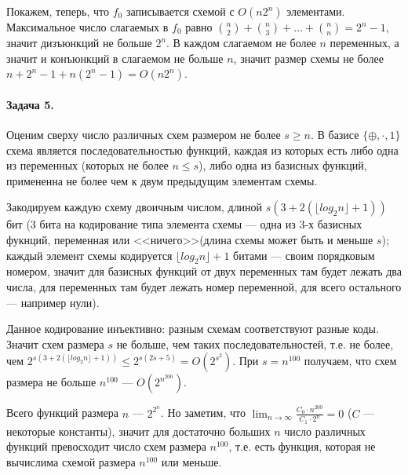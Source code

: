 \documentclass{article}
\begin{document}
    Покажем, теперь, что $f_0$ записывается схемой с $O(n2^n)$ элементами. Максимальное число слагаемых в $f_0$ равно ${n \choose 2} + {n \choose 3} + \ldots + {n \choose n} = 2^n - 1$, значит дизъюнкций не больше $2^n$. В каждом слагаемом не более $n$ переменных, а значит и конъюнкций в слагаемом не больше $n$, значит размер схемы не более $n + 2^n - 1 + n(2^n - 1) = O(n2^n)$.

    \paragraph{Задача 5.}
    Оценим сверху число различных схем размером не более $s \ge n$. В базисе $\{\oplus, \cdot, 1\}$ схема является последовательностью функций, каждая из которых есть либо одна из переменных (которых не более $n \le s$), либо одна из базисных функций, примененна не более чем к двум предыдущим элементам схемы.

    Закодируем каждую схему двоичным числом, длиной $s(3 + 2(\lfloor log_2 n \rfloor + 1))$ бит (3 бита на кодирование типа элемента схемы --- одна из 3-х базисных фукнций, переменная или <<ничего>>(длина схемы может быть и меньше $s$); каждый элемент схемы кодируется $\lfloor log_2 n \rfloor + 1$ битами --- своим порядковым номером, значит для базисных функций от двух переменных там будет лежать два числа, для переменных там будет лежать номер переменной, для всего остального --- например нули).

    Данное кодирование инъективно: разным схемам соответствуют разные коды. Значит схем размера $s$ не больше, чем таких последовательностей, т.е. не более, чем $2^{s(3 + 2(\lfloor log_2 n \rfloor + 1))} \le 2^{s(2s + 5)} = O(2^{s^2})$. При $s = n^{100}$ получаем, что схем размера не больше $n^{100}$ ---  $O(2^{n^{200}})$.

    Всего функций размера $n$ --- $2^{2^n}$. Но заметим, что $\displaystyle{ \lim_{n \to \infty} \frac{C_0 \cdot n^{200}}{C_1 \cdot 2^n} = 0}$ ($C$ --- некоторые константы), значит для достаточно больших $n$ число различных функций превосходит число схем размера $n^{100}$, т.е. есть функция, которая не вычислима схемой размера $n^{100}$ или меньше.
\end{document}
